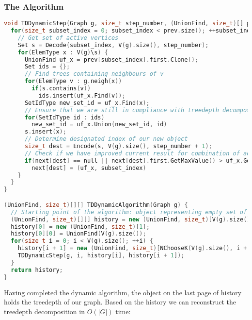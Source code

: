 \subsubsection{The Algorithm}
\begin{lstlisting}[language=C++]
void TDDynamicStep(Graph g, size_t step_number, (UnionFind, size_t)[] prev, (UnionFind, size_t)[] next) {
  for(size_t subset_index = 0; subset_index < prev.size(); ++subset_index) {
    // Get set of active vertices
    Set s = Decode(subset_index, V(g).size(), step_number);
    for(ElemType x : V(g)\s) {
      UnionFind uf_x = prev[subset_index].first.Clone();
      Set ids = {};
      // Find trees containing neighbours of v
      for(ElemType v : g.neigh(x))
        if(s.contains(v))
          ids.insert(uf_x.Find(v));
      SetIdType new_set_id = uf_x.Find(x);
      // Ensure that we are still in compliance with treedepth decomposition definition when adding x to active vertices
      for(SetIdType id : ids)
        new_set_id = uf_x.Union(new_set_id, id)
      s.insert(x);
      // Determine designated index of our new object
      size_t dest = Encode(s, V(g).size(), step_number + 1);
      // Check if we have improved current result for combination of active vertices represented by s
      if(next[dest] == null || next[dest].first.GetMaxValue() > uf_x.GetMaxValue())
        next[dest] = (uf_x, subset_index)
    }
  }
}

(UnionFind, size_t)[][] TDDynamicAlgorithm(Graph g) {
  // Starting point of the algorithm: object representing empty set of active vertices
  (UnionFind, size_t)[][] history = new (UnionFind, size_t)[V(g).size()][];
  history[0] = new (UnionFind, size_t)[1];
  history[0][0] = UnionFind(V(g).size());
  for(size_t i = 0; i < V(g).size(); ++i) {
    history[i + 1] = new (UnionFind, size_t)[NChooseK(V(g).size(), i + 1)];
    TDDynamicStep(g, i, history[i], history[i + 1]);
  }
  return history;
}
\end{lstlisting}
Having completed the dynamic algorithm, the object on the last page of history holds the treedepth of our graph. Based on the history we can reconstruct the treedepth decomposition in $O(|G|)$ time:
